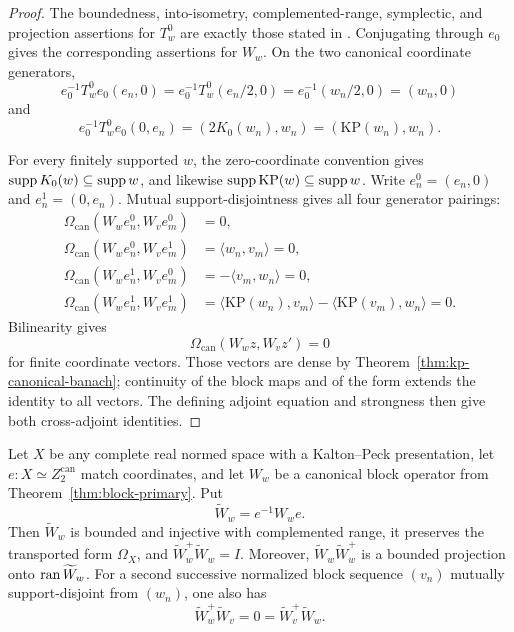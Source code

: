 \begin{proof}
The boundedness, into-isometry, complemented-range, symplectic, and projection assertions for
$T_w^0$ are exactly those stated in \cite[\S4.4]{CCGP}.  Conjugating through $e_0$ gives the
corresponding assertions for $W_w$.  On the two canonical coordinate generators,
\[
 e_0^{-1}T_w^0e_0(e_n,0)
 =e_0^{-1}T_w^0(e_n/2,0)
 =e_0^{-1}(w_n/2,0)
 =(w_n,0)
\]
and
\[
 e_0^{-1}T_w^0e_0(0,e_n)
   =(2K_0(w_n),w_n)
   =(\mathrm{KP}(w_n),w_n).
\]

For every finitely supported $w$, the zero-coordinate convention gives
$\operatorname{supp} K_0(w)\subseteq\operatorname{supp} w$, and likewise $\operatorname{supp}\mathrm{KP}(w)\subseteq\operatorname{supp} w$.  Write
$e_n^0=(e_n,0)$ and $e_n^1=(0,e_n)$.  Mutual support-disjointness gives all four generator
pairings:
\[
\begin{aligned}
 \Omega_{\mathrm{can}}(W_we_n^0,W_ve_m^0)&=0,\\
 \Omega_{\mathrm{can}}(W_we_n^0,W_ve_m^1)&=\langle w_n,v_m\rangle=0,\\
 \Omega_{\mathrm{can}}(W_we_n^1,W_ve_m^0)&=-\langle v_m,w_n\rangle=0,\\
 \Omega_{\mathrm{can}}(W_we_n^1,W_ve_m^1)
   &=\langle\mathrm{KP}(w_n),v_m\rangle
     -\langle\mathrm{KP}(v_m),w_n\rangle=0.
\end{aligned}
\]
Bilinearity gives
\[
  \Omega_{\mathrm{can}}(W_wz,W_vz')=0
\]
for finite coordinate vectors.  Those vectors are dense by
Theorem~\ref{thm:kp-canonical-banach}; continuity of the block maps and of the form extends the
identity to all vectors.  The defining adjoint equation and strongness then give both cross-adjoint
identities.
\end{proof}

\begin{theorem}\label{thm:block-transport}
Let $X$ be any complete real normed space with a Kalton--Peck presentation, let
$e:X\simeq Z_2^{\mathrm{can}}$ match coordinates, and let $W_w$ be a canonical block operator from
Theorem~\ref{thm:block-primary}.  Put
\[
  \widetilde W_w=e^{-1}W_we.
\]
Then $\widetilde W_w$ is bounded and injective with complemented range, it preserves the
transported form $\Omega_X$, and $\widetilde W_w^+\widetilde W_w=I$.  Moreover,
$\widetilde W_w\widetilde W_w^+$ is a bounded projection onto $\operatorname{ran}\widetilde W_w$.  For a second
successive normalized block sequence $(v_n)$ mutually support-disjoint from $(w_n)$, one also has
\[
  \widetilde W_w^+\widetilde W_v=0
  =\widetilde W_v^+\widetilde W_w.
\]
\leanok
\end{theorem}

